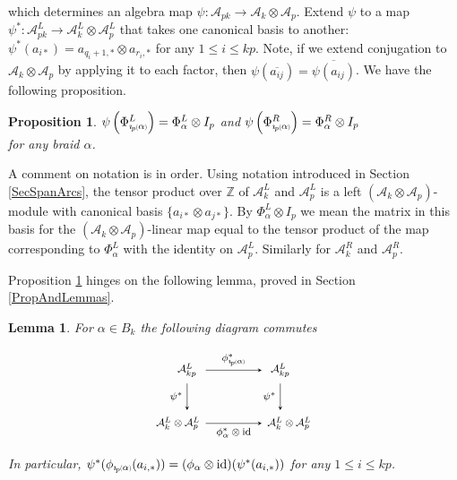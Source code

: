\documentclass[11pt]{amsart}
\def\Z{{\mathbb Z}}
\def\A{{\mathcal A}}
\newcommand*{\subsmallp}[1]{\scalebox{.5}{\ensuremath#1}}
\newcommand{\subpp}[2][p]{\imath_{\hspace*{-1pt}#1}\hspace*{-.5pt}\subsmallp(#2\subsmallp)}
\newcommand\id{\operatorname{id}}
\newtheorem{lem}[thm]{Lemma}
\newtheorem{prop}[thm]{Proposition}
\theoremstyle{definition}
\begin{document}
\noindent which determines an algebra map $\psi\colon \A_{pk} \rightarrow \A_k\otimes \A_p$. Extend $\psi$ to a map $\psi^\ast:\A_{pk}^L\to\A_k^L\otimes\A_p^L$ that takes one canonical basis to another: $\psi^\ast(a_{i\ast}) = a_{q_i+1,\ast}\otimes a_{r_i,\ast}$ for any $1\le i\le kp$. Note, if we extend conjugation to $\A_k\otimes\A_p$ by applying it to each factor, then $\psi(\overline{a_{ij}}) = \overline{\psi(a_{ij})}$. We have the following proposition.

\begin{prop}\label{psiofbp}
$\psi\left(\Phi_{\subpp\alpha}^L\right) = \Phi_\alpha^L\otimes I_p$ and $\psi\left(\Phi_{\subpp\alpha}^R\right) = \Phi_\alpha^R\otimes I_p$\\
for any braid $\alpha$.
\end{prop}

A comment on notation is in order. Using notation introduced in Section \ref{SecSpanArcs}, the tensor product over $\Z$ of $\A_k^L$ and $\A_p^L$ is a left $(\A_k\otimes\A_p)$-module with canonical basis $\{a_{i\ast}\otimes a_{j\ast}\}$. By $\Phi_\alpha^L\otimes I_p$ we mean the matrix in this basis for the $(\A_k\otimes\A_p)$-linear map equal to the tensor product of the map corresponding to $\Phi_\alpha^L$ with the identity on $\A_p^L$. Similarly for $\A_k^R$ and $\A_p^R$.

Proposition \ref{psiofbp} hinges on the following lemma, proved in Section \ref{PropAndLemmas}.

\begin{lem}\label{commutes} For $\alpha\in B_k$ the following diagram commutes

  \[\begin{tikzpicture}[scale=.75,>=stealth]
    \foreach \m in {0,3.5}
      \draw (\m,2) node {\footnotesize $\A_{kp}^L$};
    \draw (.65,0) node[left] {\footnotesize $\A_k^L\otimes\A_p^L$}
          (2.85,0) node[right] {\footnotesize $\A_k^L\otimes\A_p^L$};
    \draw[->] (.7,2) -- node[above] {\footnotesize $\phi_{\subpp\alpha}^\ast$} (2.8,2);
    \draw[->] (.7,0) -- node[below] {\footnotesize $\phi_\alpha^\ast\otimes\id$} (2.8,0);
    \foreach \p in {0,3.5}
      \draw[->] (\p,1.5) -- node[left] {\footnotesize $\psi^\ast$} (\p,.5);
  \end{tikzpicture}\]

In particular, $\psi^\ast(\phi_{\subpp\alpha}(a_{i,\ast})) = (\phi_{\alpha} \otimes \id)(\psi^\ast(a_{i,\ast}))$ for any $1\le i\le kp$.
\end{lem}
\end{document}
